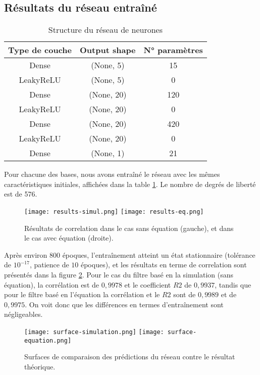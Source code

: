 \documentclass[a4paper,12pt,french]{article}
\begin{document}
\subsection*{Résultats du réseau entraîné}

\begin{table}
\centering
\begin{tabular}{|ccc|}
\hline 
Type de couche & Output shape & N° paramètres \\ 
\hline 
\hline
Dense & (None, 5) & 15 \\ 
\hline 
LeakyReLU & (None, 5) & 0 \\ 
\hline 
Dense & (None, 20) & 120 \\ 
\hline 
LeakyReLU & (None, 20) & 0 \\ 
\hline 
Dense & (None, 20) & 420 \\ 
\hline 
LeakyReLU & (None, 20) & 0 \\ 
\hline 
Dense & (None, 1) & 21 \\ 
\hline 
\end{tabular} 
\caption{Structure du réseau de neurones}
\label{tab:struct}
\end{table}

Pour chacune des bases, nous avons entraîné le réseau avec les mêmes caractéristiques initiales, affichées dans la table \ref{tab:struct}. Le nombre de degrés de liberté est de 576.
\\

\begin{figure}[ht!]
    \centering
    \texttt{[image: results-simul.png]}
    \texttt{[image: results-eq.png]}
    \caption{Résultats de correlation dans le cas sans équation (gauche), et dans le cas avec équation (droite).}
    \label{fig:correl}
\end{figure}

Après environ 800 époques, l'entraînement atteint un état stationnaire (tolérance de $10^{-17}$, patience de $10$ époques), et les résultats en terme de correlation sont présentés dans la figure \ref{fig:correl}. Pour le cas du filtre basé en la simulation (sans équation), la corrélation est de $0,9978$ et le coefficient $R2$ de $0,9937$, tandis que pour le filtre basé en l'équation la corrélation et le $R2$ sont de $0,9989$ et de $0,9975$. On voit donc que les différences en termes d'entraînement sont négligeables. 
\\


\begin{figure}[ht!]
    \centering
    \texttt{[image: surface-simulation.png]}
    \texttt{[image: surface-equation.png]}
    \caption{Surfaces de comparaison des prédictions du réseau contre le résultat théorique.}
    \label{fig:correl}
\end{figure}
\end{document}
